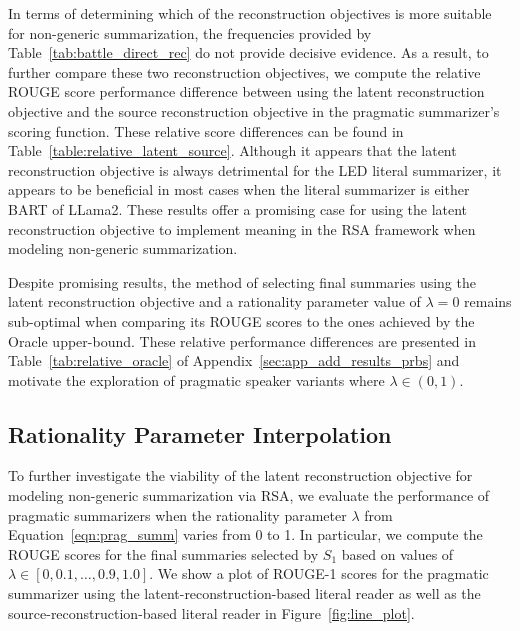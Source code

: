 \documentclass[11pt]{article}
\begin{document}
In terms of determining which of the reconstruction objectives is more suitable for non-generic summarization, the frequencies provided by Table~\ref{tab:battle_direct_rec} do not provide decisive evidence. As a result, to further compare these two reconstruction objectives, we compute the relative ROUGE score performance difference between using the latent reconstruction objective and the source reconstruction objective in the pragmatic summarizer's scoring function. These relative score differences can be found in Table~\ref{table:relative_latent_source}. Although it appears that the latent reconstruction objective is always detrimental for the LED literal summarizer, it appears to be beneficial in most cases when the literal summarizer is either BART of LLama2. These results offer a promising case for using the latent reconstruction objective to implement meaning in the RSA framework when modeling non-generic summarization.

Despite promising results, the method of selecting final summaries using the latent reconstruction objective and a rationality parameter value of $\lambda = 0$ remains sub-optimal when comparing its ROUGE scores to the ones achieved by the Oracle upper-bound. These relative performance differences are presented in Table~\ref{tab:relative_oracle} of Appendix~\ref{sec:app_add_results_prbs} and motivate the exploration of pragmatic speaker variants where $\lambda  \in (0,1)$.

\subsection{Rationality Parameter Interpolation}

To further investigate the viability of the latent reconstruction objective for modeling non-generic summarization via RSA, we evaluate the performance of pragmatic summarizers when the rationality parameter $\lambda$ from Equation~\ref{eqn:prag_summ} varies from 0 to 1. In particular, we compute the ROUGE scores for the final summaries selected by $S_1$ based on values of $\lambda \in [0, 0.1, \dots, 0.9, 1.0]$. We show a plot of ROUGE-1 scores for the pragmatic summarizer using the latent-reconstruction-based literal reader as well as the source-reconstruction-based literal reader in Figure~\ref{fig:line_plot}.
\end{document}
